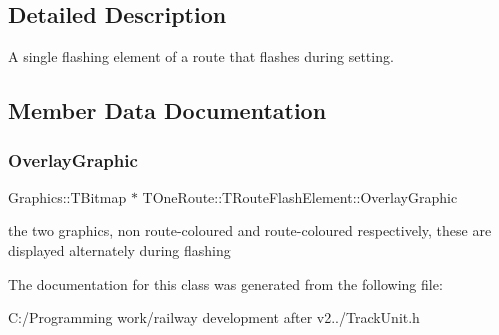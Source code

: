 \subsection{Detailed Description}
A single flashing element of a route that flashes during setting. 

\subsection{Member Data Documentation}
\mbox{\label{class_t_one_route_1_1_t_route_flash_element_a9728c9fe83d991d41596efa2cf07129f}} 
\subsubsection{\texorpdfstring{Overlay\+Graphic}{OverlayGraphic}}
{\footnotesize\ttfamily Graphics\+::\+T\+Bitmap $\ast$ T\+One\+Route\+::\+T\+Route\+Flash\+Element\+::\+Overlay\+Graphic}

the two graphics, non route-\/coloured and route-\/coloured respectively, these are displayed alternately during flashing 

The documentation for this class was generated from the following file\+:\begin{DoxyCompactItemize}
\item 
C\+:/\+Programming work/railway development after v2../Track\+Unit.\+h\end{DoxyCompactItemize}
